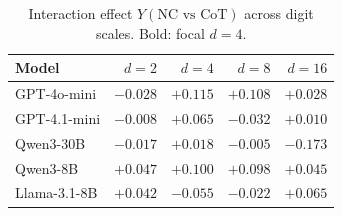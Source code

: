 \begin{table}[t]
\centering
\small
\caption{Interaction effect $Y(\text{NC vs CoT})$ across digit scales. Bold: focal $d{=}4$.}
\label{tab:all_scales}
\begin{tabular}{lrrrr}
\toprule
Model & $d{=}2$ & $d{=}4$ & $d{=}8$ & $d{=}16$ \\
\midrule
GPT-4o-mini  & $-0.028$ & $\mathbf{+0.115}$ & $+0.108$ & $+0.028$ \\
GPT-4.1-mini & $-0.008$ & $\mathbf{+0.065}$ & $-0.032$ & $+0.010$ \\
Qwen3-30B    & $-0.017$ & $\mathbf{+0.018}$ & $-0.005$ & $-0.173$ \\
Qwen3-8B     & $+0.047$ & $\mathbf{+0.100}$ & $+0.098$ & $+0.045$ \\
Llama-3.1-8B & $+0.042$ & $\mathbf{-0.055}$ & $-0.022$ & $+0.065$ \\
\bottomrule
\end{tabular}
\end{table}
